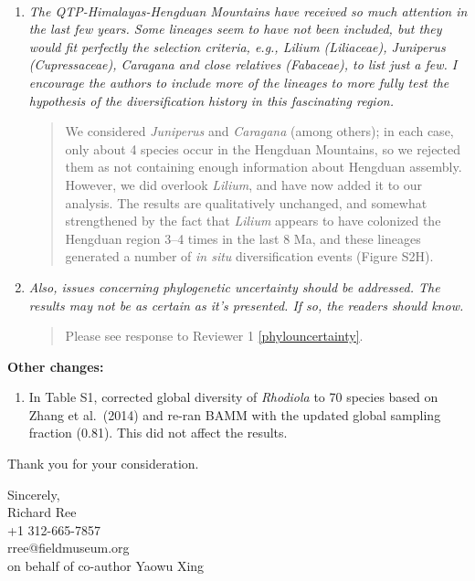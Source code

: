 \documentclass[11pt]{letter}
\begin{document}
\begin{letter}{ \\

}
\begin{enumerate}
\item \textit{The QTP-Himalayas-Hengduan Mountains have received so
    much attention in the last few years. Some lineages seem to have
    not been included, but they would fit perfectly the selection
    criteria, e.g., Lilium (Liliaceae), Juniperus (Cupressaceae),
    Caragana and close relatives (Fabaceae), to list just a few. I
    encourage the authors to include more of the lineages to more
    fully test the hypothesis of the diversification history in this
    fascinating region.}

  \begin{quote}
    We considered \textit{Juniperus} and \textit{Caragana} (among
    others); in each case, only about 4 species occur in the Hengduan
    Mountains, so we rejected them as not containing enough
    information about Hengduan assembly. However, we did overlook
    \textit{Lilium}, and have now added it to our analysis. The
    results are qualitatively unchanged, and somewhat strengthened by
    the fact that \textit{Lilium} appears to have colonized the
    Hengduan region 3--4 times in the last 8 Ma, and these lineages
    generated a number of \textit{in situ} diversification events
    (Figure S2H).
  \end{quote}

\item \textit{Also, issues concerning phylogenetic uncertainty should
    be addressed. The results may not be as certain as it's
    presented. If so, the readers should know.}

  \begin{quote}
    Please see response to Reviewer 1 \ref{phylouncertainty}.
  \end{quote}

\end{enumerate}

\textbf{Other changes:}

\begin{enumerate}

\item In Table S1, corrected global diversity of \textit{Rhodiola} to
  70 species based on Zhang et al.\ (2014) and re-ran BAMM with the
  updated global sampling fraction (0.81). This did not affect the
  results.

\end{enumerate}

Thank you for your consideration.


\closing{Sincerely,\\
  \bigskip
  Richard Ree\\
  +1 312-665-7857\\
  rree@fieldmuseum.org\\
  \medskip on behalf of co-author Yaowu Xing
  }


\end{letter}
\end{document}
